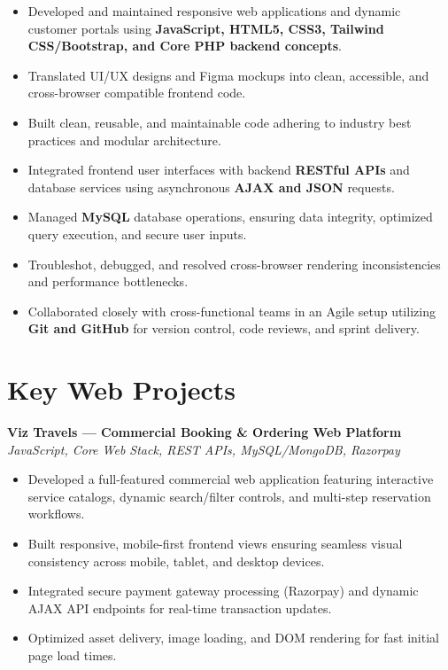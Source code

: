 \documentclass[a4paper,10pt]{article}
\begin{document}
\begin{itemize}

    \item Developed and maintained responsive web applications and dynamic customer portals using \textbf{JavaScript, HTML5, CSS3, Tailwind CSS/Bootstrap, and Core PHP backend concepts}.

    \item Translated UI/UX designs and Figma mockups into clean, accessible, and cross-browser compatible frontend code.

    \item Built clean, reusable, and maintainable code adhering to industry best practices and modular architecture.

    \item Integrated frontend user interfaces with backend \textbf{RESTful APIs} and database services using asynchronous \textbf{AJAX and JSON} requests.

    \item Managed \textbf{MySQL} database operations, ensuring data integrity, optimized query execution, and secure user inputs.

    \item Troubleshot, debugged, and resolved cross-browser rendering inconsistencies and performance bottlenecks.

    \item Collaborated closely with cross-functional teams in an Agile setup utilizing \textbf{Git and GitHub} for version control, code reviews, and sprint delivery.

\end{itemize}

\section*{Key Web Projects}

\textbf{Viz Travels --- Commercial Booking \& Ordering Web Platform}
\hfill
\textit{JavaScript, Core Web Stack, REST APIs, MySQL/MongoDB, Razorpay}

\begin{itemize}

    \item Developed a full-featured commercial web application featuring interactive service catalogs, dynamic search/filter controls, and multi-step reservation workflows.

    \item Built responsive, mobile-first frontend views ensuring seamless visual consistency across mobile, tablet, and desktop devices.

    \item Integrated secure payment gateway processing (Razorpay) and dynamic AJAX API endpoints for real-time transaction updates.

    \item Optimized asset delivery, image loading, and DOM rendering for fast initial page load times.

\end{itemize}
\end{document}
